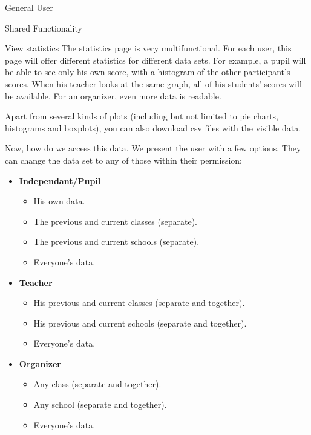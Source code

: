 \begin{section}{General User}
\begin{subsection}{Shared Functionality}
        \begin{subsubsection}{View statistics}
            The statistics page is very multifunctional. For each user, this
            page will offer different statistics for different data sets. For
            example, a pupil will be able to see only his own score, with a
            histogram of the other participant's scores. When his teacher looks
            at the same graph, all of his students' scores will be available.
            For an organizer, even more data is readable.

            Apart from several kinds of plots (including but not limited to pie
            charts, histograms and boxplots), you can also download csv files
            with the visible data.

            Now, how do we access this data. We present the user with a few
            options. They can change the data set to any of those within their
            permission:

            \begin{itemize}
                \item \textbf{Independant/Pupil}
                    \begin{itemize}
                        \item His own data.
                        \item The previous and current classes (separate).
                        \item The previous and current schools (separate).
                        \item Everyone's data.
                    \end{itemize}
                \item \textbf{Teacher}
                    \begin{itemize}
                        \item His previous and current classes (separate and
                            together).
                        \item His previous and current schools (separate and
                            together).
                        \item Everyone's data.
                    \end{itemize}
                \item \textbf{Organizer}
                    \begin{itemize}
                        \item Any class (separate and together).
                        \item Any school (separate and together).
                        \item Everyone's data.
                    \end{itemize}
            \end{itemize}


\end{subsubsection}
\end{subsection}
\end{section}
